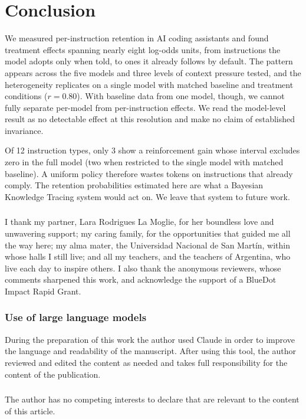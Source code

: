 \documentclass[a4paper]{llncs}
\begin{document}
\section{Conclusion}
\label{sec:conclusion}

We measured per-instruction retention in AI coding assistants and found
treatment effects spanning nearly eight log-odds units, from
instructions the model adopts only when told, to ones it already follows
by default. The pattern appears across the five models and three
levels of context pressure tested, and the heterogeneity replicates on a
single model with matched baseline and treatment conditions ($r = 0.80$).
With baseline data from one model, though, we cannot fully separate
per-model from per-instruction effects. We read the model-level result as
no detectable effect at this resolution and make no claim of established
invariance.

Of 12 instruction types, only 3 show a reinforcement gain whose interval
excludes zero in the full model (two when restricted to the single model
with matched baseline). A uniform policy therefore wastes tokens on
instructions that already comply. The retention probabilities estimated here are what a
Bayesian Knowledge Tracing system would act on. We leave that system to
future work.


\begin{credits}
\subsubsection{\ackname} I thank my partner, Lara Rodrigues La Moglie, for
her boundless love and unwavering support; my caring family, for the
opportunities that guided me all the way here; my alma mater, the Universidad
Nacional de San Mart\'in, within whose halls I still live; and all my
teachers, and the teachers of Argentina, who live each day to inspire others.
I also thank the anonymous reviewers, whose comments sharpened this work, and
acknowledge the support of a BlueDot Impact Rapid Grant.

\subsubsection{Use of large language models}
During the preparation of this work the author used Claude in order to improve
the language and readability of the manuscript. After using this tool, the
author reviewed and edited the content as needed and takes full responsibility
for the content of the publication.

\subsubsection{\discintname}
The author has no competing interests to declare that are relevant to
the content of this article.
\end{credits}

\printbibliography
\end{document}
